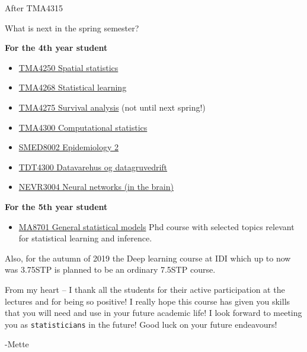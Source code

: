 \documentclass[ignorenonframetext,]{beamer}
\providecommand{\tightlist}{%
  \setlength{\itemsep}{0pt}\setlength{\parskip}{0pt}}
\begin{document}
\begin{frame}{After TMA4315}

What is next in the spring semester?

\textbf{For the 4th year student}

\begin{itemize}
\tightlist
\item
  \href{https://www.math.ntnu.no/emner/TMA4250}{TMA4250 Spatial
  statistics}
\item
  \href{https://www.math.ntnu.no/emner/TMA4268}{TMA4268 Statistical
  learning}
\item
  \href{https://www.math.ntnu.no/emner/TMA4275/}{TMA4275 Survival
  analysis} (not until next spring!)
\item
  \href{https://www.math.ntnu.no/emner/TMA4300/}{TMA4300 Computational
  statistics}
\item
  \href{https://www.ntnu.no/studier/emner/SMED8002/}{SMED8002
  Epidemiology 2}
\item
  \href{https://www.ntnu.no/studier/emner/TDT4300/}{TDT4300 Datavarehus
  og datagruvedrift}
\item
  \href{https://www.ntnu.no/studier/emner/NEVR3004/}{NEVR3004 Neural
  networks (in the brain)}
\end{itemize}

\end{frame}

\begin{frame}

\textbf{For the 5th year student}

\begin{itemize}
\tightlist
\item
  \href{https://wiki.math.ntnu.no/ma8701/2019v}{MA8701 General
  statistical models} Phd course with selected topics relevant for
  statistical learning and inference.
\end{itemize}

Also, for the autumn of 2019 the Deep learning course at IDI which up to
now was 3.75STP is planned to be an ordinary 7.5STP course.

\end{frame}


\begin{frame}[fragile]

From my heart -- I thank all the students for their active participation
at the lectures and for being so positive! I really hope this course has
given you skills that you will need and use in your future academic
life! I look forward to meeting you as \texttt{statisticians} in the
future! Good luck on your future endeavours!

-Mette

\end{frame}
\end{document}
